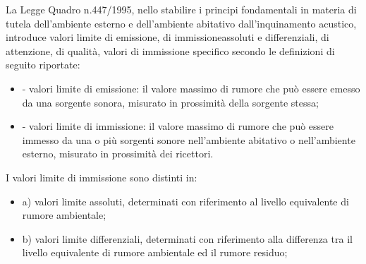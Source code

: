La Legge Quadro n.447/1995, nello stabilire i principi fondamentali in materia di tutela dell'ambiente esterno e dell'ambiente abitativo dall'inquinamento acustico, introduce valori limite di emissione, di immissioneassoluti e differenziali, 
di attenzione, di qualità, valori di immissione specifico secondo le definizioni di seguito riportate:
\begin{itemize}
\item - valori limite di emissione: il valore massimo di rumore che può essere emesso da una sorgente sonora, misurato in prossimità della sorgente stessa;
\item - valori limite di immissione: il valore massimo di rumore che può essere immesso da una o più sorgenti sonore nell'ambiente abitativo o nell'ambiente esterno, misurato in prossimità dei ricettori. 
\end{itemize}

I valori limite di immissione sono distinti in:
\begin{itemize}
\item a) valori limite assoluti, determinati con riferimento al livello equivalente di rumore ambientale;
\item b) valori limite differenziali, determinati con riferimento alla differenza tra il livello equivalente di rumore ambientale ed il rumore residuo;
\end{itemize}


